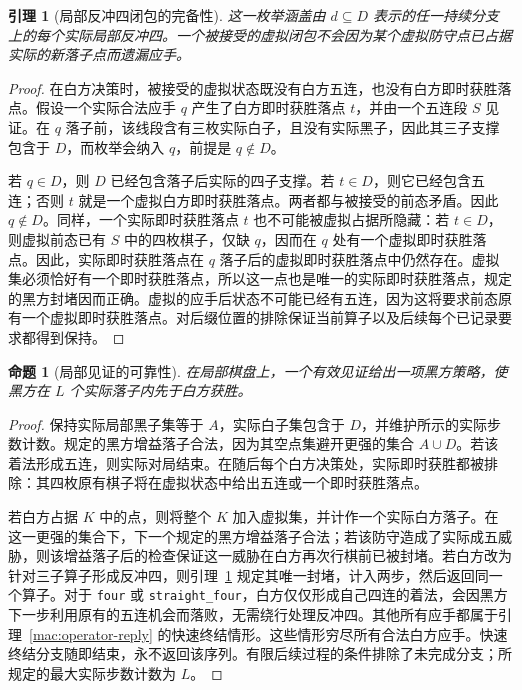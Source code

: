\documentclass[11pt]{article}
\newtheorem{lemma}[theorem]{引理}
\newtheorem{proposition}[theorem]{命题}
\theoremstyle{definition}
\theoremstyle{remark}
\begin{document}
\begin{lemma}[局部反冲四闭包的完备性]\label{mac:local-counter}
这一枚举涵盖由 \(d\subseteq D\) 表示的任一持续分支上的每个实际局部反冲四。一个被接受的虚拟闭包不会因为某个虚拟防守点已占据实际的新落子点而遗漏应手。

\end{lemma}
\begin{proof}
在白方决策时，被接受的虚拟状态既没有白方五连，也没有白方即时获胜落点。假设一个实际合法应手 \(q\) 产生了白方即时获胜落点 \(t\)，并由一个五连段 \(S\) 见证。在 \(q\) 落子前，该线段含有三枚实际白子，且没有实际黑子，因此其三子支撑包含于 \(D\)，而枚举会纳入 \(q\)，前提是 \(q\notin D\)。

若 \(q\in D\)，则 \(D\) 已经包含落子后实际的四子支撑。若 \(t\in D\)，则它已经包含五连；否则 \(t\) 就是一个虚拟白方即时获胜落点。两者都与被接受的前态矛盾。因此 \(q\notin D\)。同样，一个实际即时获胜落点 \(t\) 也不可能被虚拟占据所隐藏：若 \(t\in D\)，则虚拟前态已有 \(S\) 中的四枚棋子，仅缺 \(q\)，因而在 \(q\) 处有一个虚拟即时获胜落点。因此，实际即时获胜落点在 \(q\) 落子后的虚拟即时获胜落点中仍然存在。虚拟集必须恰好有一个即时获胜落点，所以这一点也是唯一的实际即时获胜落点，规定的黑方封堵因而正确。虚拟的应手后状态不可能已经有五连，因为这将要求前态原有一个虚拟即时获胜落点。对后缀位置的排除保证当前算子以及后续每个已记录要求都得到保持。
\end{proof}

\begin{proposition}[局部见证的可靠性]\label{mac:local-witness}
在局部棋盘上，一个有效见证给出一项黑方策略，使黑方在 \(L\) 个实际落子内先于白方获胜。

\end{proposition}
\begin{proof}
保持实际局部黑子集等于 \(A\)，实际白子集包含于 \(D\)，并维护所示的实际步数计数。规定的黑方增益落子合法，因为其空点集避开更强的集合 \(A\cup D\)。若该着法形成五连，则实际对局结束。在随后每个白方决策处，实际即时获胜都被排除：其四枚原有棋子将在虚拟状态中给出五连或一个即时获胜落点。

若白方占据 \(K\) 中的点，则将整个 \(K\) 加入虚拟集，并计作一个实际白方落子。在这一更强的集合下，下一个规定的黑方增益落子合法；若该防守造成了实际成五威胁，则该增益落子后的检查保证这一威胁在白方再次行棋前已被封堵。若白方改为针对三子算子形成反冲四，则引理~\ref{mac:local-counter} 规定其唯一封堵，计入两步，然后返回同一个算子。对于 \texttt{four} 或 \texttt{straight\_four}，白方仅仅形成自己四连的着法，会因黑方下一步利用原有的五连机会而落败，无需绕行处理反冲四。其他所有应手都属于引理~\ref{mac:operator-reply} 的快速终结情形。这些情形穷尽所有合法白方应手。快速终结分支随即结束，永不返回该序列。有限后续过程的条件排除了未完成分支；所规定的最大实际步数计数为 \(L\)。
\end{proof}
\end{document}
